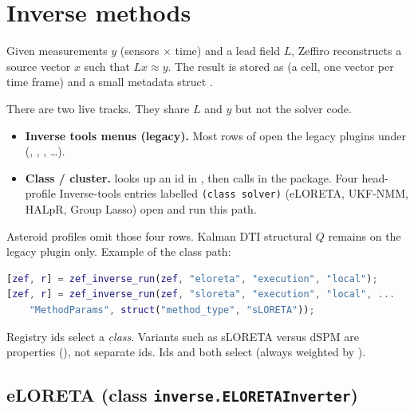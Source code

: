 \section{Inverse methods}\label{sec:inverse_methods.tex}

Given measurements \(y\) (sensors \(\times\) time) and a lead field \(L\),
Zeffiro reconstructs a source vector \(x\) such that \(Lx \approx y\). The
result is stored as  (a cell, one vector per time
frame) and a small metadata struct .

There are two live tracks. They share \(L\) and \(y\) but not the solver
code.

\begin{itemize}
\item \textbf{Inverse tools menus (legacy).} Most rows of
       open the legacy plugins
      under  (,
      , , \ldots).
\item \textbf{Class / cluster.}  looks up an id in
      , then
       calls
       in the  package.
      Four head-profile Inverse-tools entries labelled
      \texttt{(class solver)} (eLORETA, UKF-NMM, HALpR, Group Lasso)
      open  and run this path.
\end{itemize}

Asteroid profiles omit those four rows. Kalman DTI structural \(Q\) remains
on the legacy plugin only. Example of the class path:

\begin{lstlisting}[style=unnumberedlines, language=Matlab]
[zef, r] = zef_inverse_run(zef, "eloreta", "execution", "local");
[zef, r] = zef_inverse_run(zef, "sloreta", "execution", "local", ...
    "MethodParams", struct("method_type", "sLORETA"));
\end{lstlisting}

Registry ids select a \emph{class}. Variants such as sLORETA versus dSPM are
properties (), not separate ids. Ids  and
 both select  (always weighted by
).

\subsection{eLORETA (class \texttt{inverse.ELORETAInverter})}

